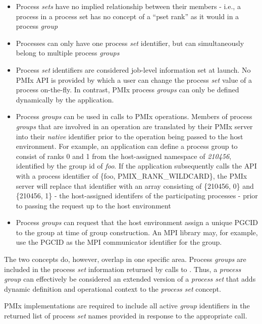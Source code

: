 \begin{itemize}
    \item Process \emph{sets} have no implied relationship between their members - i.e., a process in a process set has no concept of a ``pset rank'' as it would in a process \emph{group}
    \item Processes can only have one process \emph{set} identifier, but can simultaneously belong to multiple process \emph{groups}
    \item Process \emph{set} identifiers are considered job-level information set at launch. No \ac{PMIx} \ac{API} is provided by which a user can change the process \emph{set} value of a process on-the-fly. In contrast, \ac{PMIx} process \emph{groups} can only be defined dynamically by the application.
    \item Process \emph{groups} can be used in calls to \ac{PMIx} operations. Members of process \emph{groups} that are involved in an operation are translated by their \ac{PMIx} server into their \emph{native} identifier prior to the operation being passed to the host environment. For example, an application can define a process group to consist of ranks 0 and 1 from the host-assigned namespace of \emph{210456}, identified by the group id of \emph{foo}. If the application subsequently calls the  \ac{API} with a process identifier of \{foo, PMIX_RANK_WILDCARD\}, the \ac{PMIx} server will replace that identifier with an array consisting of \{210456, 0\} and \{210456, 1\} - the host-assigned identifers of the participating processes - prior to passing the request up to the host environment
    \item Process \emph{groups} can request that the host environment assign a unique  \ac{PGCID} to the group at time of group construction. An \ac{MPI} library may, for example, use the \ac{PGCID} as the \ac{MPI} communicator identifier for the group.
\end{itemize}

The two concepts do, however, overlap in one specific area. Process \emph{groups} are included in the process \emph{set} information returned by calls to . Thus, a \emph{process group} can effectively be considered an extended version of a \emph{process set} that adds dynamic definition and operational context to the \emph{process set} concept.

\adviceimplstart
\ac{PMIx} implementations are required to include all active \emph{group} identifiers in the returned list of process \emph{set} names provided in response to the appropriate  call.
\adviceimplend

